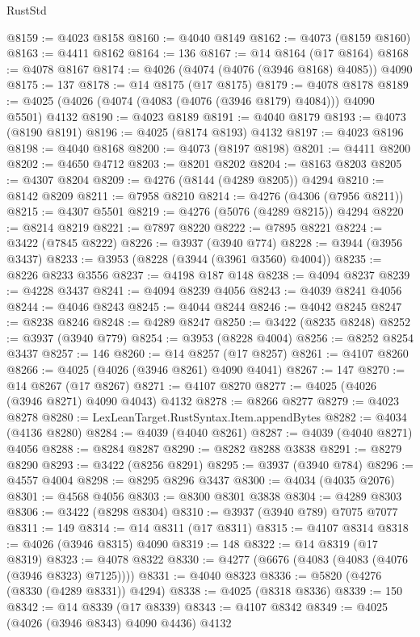 \begin{lexlean}{RustStd}
\begin{coremodule}
@8159 := @4023 @8158
@8160 := @4040 @8149
@8162 := @4073 (@8159 @8160)
@8163 := @4411 @8162
@8164 := 136
@8167 := @14 @8164 (@17 @8164)
@8168 := @4078 @8167
@8174 := @4026 (@4074 (@4076 (@3946 @8168) @4085)) @4090
@8175 := 137
@8178 := @14 @8175 (@17 @8175)
@8179 := @4078 @8178
@8189 := @4025 (@4026 (@4074 (@4083 (@4076 (@3946 @8179) @4084))) @4090 @5501) @4132
@8190 := @4023 @8189
@8191 := @4040 @8179
@8193 := @4073 (@8190 @8191)
@8196 := @4025 (@8174 @8193) @4132
@8197 := @4023 @8196
@8198 := @4040 @8168
@8200 := @4073 (@8197 @8198)
@8201 := @4411 @8200
@8202 := @4650 @4712
@8203 := @8201 @8202
@8204 := @8163 @8203
@8205 := @4307 @8204
@8209 := @4276 (@8144 (@4289 @8205)) @4294
@8210 := @8142 @8209
@8211 := @7958 @8210
@8214 := @4276 (@4306 (@7956 @8211))
@8215 := @4307 @5501
@8219 := @4276 (@5076 (@4289 @8215)) @4294
@8220 := @8214 @8219
@8221 := @7897 @8220
@8222 := @7895 @8221
@8224 := @3422 (@7845 @8222)
@8226 := @3937 (@3940 @774)
@8228 := @3944 (@3956 @3437)
@8233 := @3953 (@8228 (@3944 (@3961 @3560) @4004))
@8235 := @8226 @8233 @3556
@8237 := @4198 @187 @148
@8238 := @4094 @8237
@8239 := @4228 @3437
@8241 := @4094 @8239 @4056
@8243 := @4039 @8241 @4056
@8244 := @4046 @8243
@8245 := @4044 @8244
@8246 := @4042 @8245
@8247 := @8238 @8246
@8248 := @4289 @8247
@8250 := @3422 (@8235 @8248)
@8252 := @3937 (@3940 @779)
@8254 := @3953 (@8228 @4004)
@8256 := @8252 @8254 @3437
@8257 := 146
@8260 := @14 @8257 (@17 @8257)
@8261 := @4107 @8260
@8266 := @4025 (@4026 (@3946 @8261) @4090 @4041)
@8267 := 147
@8270 := @14 @8267 (@17 @8267)
@8271 := @4107 @8270
@8277 := @4025 (@4026 (@3946 @8271) @4090 @4043) @4132
@8278 := @8266 @8277
@8279 := @4023 @8278
@8280 := LexLeanTarget.RustSyntax.Item.appendBytes
@8282 := @4034 (@4136 @8280)
@8284 := @4039 (@4040 @8261)
@8287 := @4039 (@4040 @8271) @4056
@8288 := @8284 @8287
@8290 := @8282 @8288 @3838
@8291 := @8279 @8290
@8293 := @3422 (@8256 @8291)
@8295 := @3937 (@3940 @784)
@8296 := @4557 @4004
@8298 := @8295 @8296 @3437
@8300 := @4034 (@4035 @2076)
@8301 := @4568 @4056
@8303 := @8300 @8301 @3838
@8304 := @4289 @8303
@8306 := @3422 (@8298 @8304)
@8310 := @3937 (@3940 @789) @7075 @7077
@8311 := 149
@8314 := @14 @8311 (@17 @8311)
@8315 := @4107 @8314
@8318 := @4026 (@3946 @8315) @4090
@8319 := 148
@8322 := @14 @8319 (@17 @8319)
@8323 := @4078 @8322
@8330 := @4277 (@6676 (@4083 (@4083 (@4076 (@3946 @8323) @7125))))
@8331 := @4040 @8323
@8336 := @5820 (@4276 (@8330 (@4289 @8331)) @4294)
@8338 := @4025 (@8318 @8336)
@8339 := 150
@8342 := @14 @8339 (@17 @8339)
@8343 := @4107 @8342
@8349 := @4025 (@4026 (@3946 @8343) @4090 @4436) @4132

\end{coremodule}
\end{lexlean}
